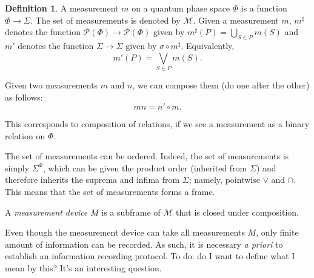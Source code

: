 \documentclass{article}
\theoremstyle{definition}
\newtheorem{definition}{Definition}
\theoremstyle{plain}
\newcommand{\ps}{\mathcal{P}}
\begin{document}
\begin{definition}
A measurement $m$ on a quantum phase space $\Phi$ is a function $\Phi \to \Sigma$. The set of measurements is denoted by $\mathcal{M}$. Given a measurement $m$, $m^\sharp$ denotes the function $\ps(\Phi) \to \ps(\Phi)$ given by $m^\sharp(P) = \bigcup_{S \in P} m(S)$ and $m'$ denotes the function $\Sigma \to \Sigma$ given by $\sigma \circ m^\sharp$. Equivalently,
\[m'(P) = \bigvee_{S \in P} m(S).\]

Given two measurements $m$ and $n$, we can compose them (do one after the other) as follows:
\[mn = n' \circ m.\]

This corresponds to composition of relations, if we see a measurement as a binary relation on $\Phi$.

The set of measurements can be ordered. Indeed, the set of measurements is simply $\Sigma^\Phi$, which can be given the product order (inherited from $\Sigma$) and therefore inherits the suprema and infima from $\Sigma$; namely, pointwise $\vee$ and $\cap$. This means that the set of measurements forms a frame.

A \emph{measurement device} $M$ is a subframe of $\mathcal{M}$ that is closed under composition.
\end{definition}

Even though the measurement device can take all measurements $M$, only finite amount of information can be recorded. As such, it is necessary \textit{a priori} to establish an information recording protocol. To do: do I want to define what I mean by this? It's an interesting question.

{}

\end{document}
